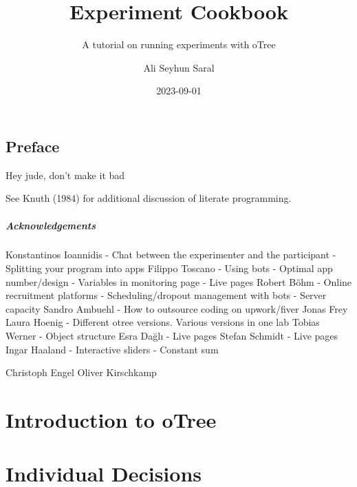 \documentclass[
  letterpaper,
  DIV=11,
  numbers=noendperiod]{scrreprt}
\title{Experiment Cookbook}
\subtitle{A tutorial on running experiments with oTree}
\author{Ali Seyhun Saral}
\date{2023-09-01}
\renewcommand*\contentsname{Table of contents}
\newcommand\contentsname{Table of contents}
\begin{document}
\maketitle
\ifdefined\Shaded\renewenvironment{Shaded}{\begin{tcolorbox}[interior hidden, boxrule=0pt, enhanced, sharp corners, frame hidden, breakable, borderline west={3pt}{0pt}{shadecolor}]}{\end{tcolorbox}}\fi

\renewcommand*\contentsname{Table of contents}
{
\hypersetup{linkcolor=}
\setcounter{tocdepth}{2}
\tableofcontents
}

\hypertarget{preface}{%
\chapter*{Preface}\label{preface}}


Hey jude, don't make it bad

See Knuth (1984) for additional discussion of literate programming.

\hypertarget{acknowledgements}{%
\subsubsection*{Acknowledgements}\label{acknowledgements}}

Konstantinos Ioannidis - Chat between the experimenter and the
participant - Splitting your program into apps Filippo Toscano - Using
bots - Optimal app number/design - Variables in monitoring page - Live
pages Robert Böhm - Online recruitment platforms - Scheduling/dropout
management with bots - Server capacity Sandro Ambuehl - How to outsource
coding on upwork/fiver Jonas Frey Laura Hoenig - Different otree
versions. Various versions in one lab Tobias Werner - Object structure
Esra Dağlı - Live pages Stefan Schmidt - Live pages Ingar Haaland -
Interactive sliders - Constant sum

Christoph Engel Oliver Kirschkamp

\part{Introduction to oTree}

\part{Individual Decisions}
\end{document}
